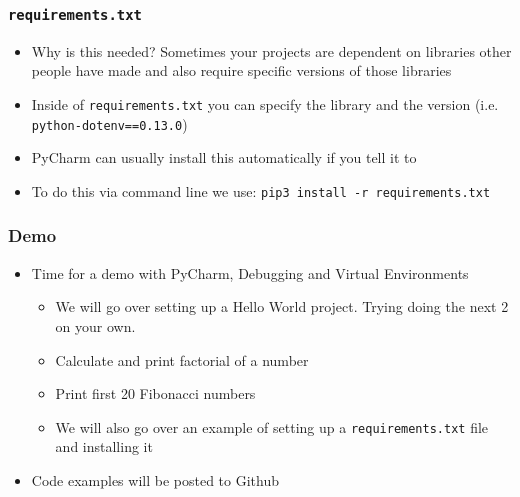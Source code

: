 \documentclass{beamer}
\begin{document}
\begin{frame}
  \frametitle{\texttt{requirements.txt}}
  \begin{itemize}
  	\item Why is this needed? Sometimes your projects are dependent on libraries other people have made and also require specific versions of those libraries 
  	\item Inside of \texttt{requirements.txt} you can specify the library and the version (i.e. \texttt{python-dotenv==0.13.0})
  	\item PyCharm can usually install this automatically if you tell it to
  	\item To do this via command line we use: \texttt{pip3 install -r requirements.txt}
  \end{itemize}
\end{frame}

\begin{frame}
  \frametitle{Demo}
  \begin{itemize}
  	\item Time for a demo with PyCharm, Debugging and Virtual Environments
  		\begin{itemize}
  			\item We will go over setting up a Hello World project. Trying doing the next 2 on your own.
  			\item Calculate and print factorial of a number
  			\item Print first 20 Fibonacci numbers
  			\item We will also go over an example of setting up a \texttt{requirements.txt} file and installing it
  		\end{itemize}
  	\item Code examples will be posted to Github
  \end{itemize}
   \end{frame}
\end{document}
